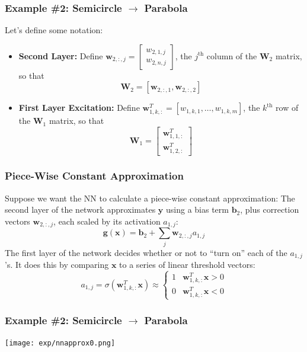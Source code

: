 \documentclass{beamer}
\begin{document}
\begin{frame}
  \frametitle{Example \#2: Semicircle $\rightarrow$ Parabola}

  Let's define some notation:
  \begin{itemize}
  \item {\bf Second Layer:} Define
    $\mathbf{w}_{2,:,j}=\left[\begin{array}{c}w_{2,1,j}\\w_{2,n,j}\end{array}\right]$,
    the $j^{\textrm{th}}$ column of the $\mathbf{W}_2$ matrix, so that
    \[
    \mathbf{W}_2=\left[\mathbf{w}_{2,:,1},\mathbf{w}_{2,:,2}\right]
    \]
  \item {\bf First Layer Excitation:} Define
    $\mathbf{w}_{1,k,:}^T=[w_{1,k,1},\ldots,w_{1,k,m}]$, the
    $k^{\textrm{th}}$ row of the $\mathbf{W}_1$ matrix, so that
    \[
    \mathbf{W}_1=\left[\begin{array}{c}\mathbf{w}_{1,1,:}^T\\\mathbf{w}_{1,2,:}^T\end{array}\right]
    \]
  \end{itemize}
\end{frame}

\begin{frame}
  \frametitle{Piece-Wise Constant Approximation}

  Suppose we want the NN to calculate a piece-wise constant approximation: 
  The second layer of the network approximates $\mathbf{y}$ using a bias term $\mathbf{b}_2$,
  plus correction vectors $\mathbf{w}_{2,:,j}$, each scaled by its activation $a_{1,j}$:
  \[
  \mathbf{g}(\mathbf{x}) = \mathbf{b}_2 + \sum_j \mathbf{w}_{2,:,j} a_{1,j}
  \]
  The first layer of the network decides whether or not to ``turn on'' each of the
  $a_{1,j}$'s.  It does this by comparing $\mathbf{x}$ to a series of linear threshold vectors:
  \[
  a_{1,j} = \sigma\left(\mathbf{w}_{1,k,:}^T\mathbf{x}\right)\approx\begin{cases}
  1 & \mathbf{w}_{1,k,:}^T\mathbf{x} > 0\\
  0 & \mathbf{w}_{1,k,:}^T\mathbf{x} < 0
  \end{cases}
  \]
\end{frame}

\begin{frame}
  \frametitle{Example \#2: Semicircle $\rightarrow$ Parabola}

  \texttt{[image: exp/nnapprox0.png]}
\end{frame}
\end{document}
